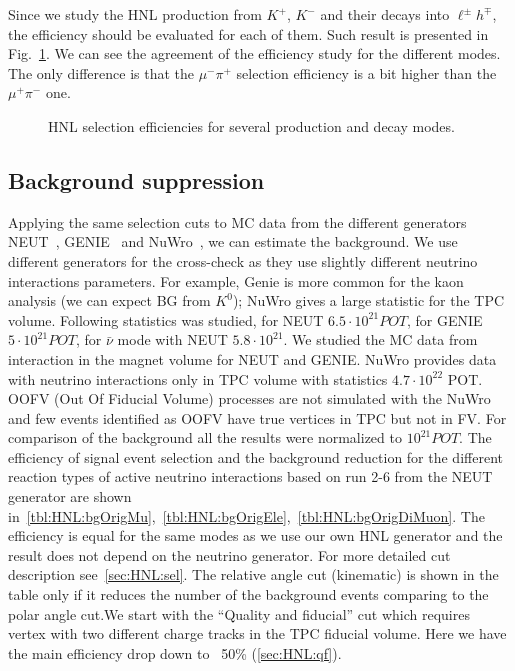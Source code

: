 \documentclass[../main.tex]{subfiles}
\begin{document}
Since we study the HNL production from $K^+$,  $K^-$ and their decays into $\ell^{\pm}h^{\mp}$, the efficiency should be evaluated for each of them. Such result is presented in Fig.~\ref{fig:HNL:C_check}. We can see the agreement of the efficiency study for the different modes. The only difference is that the $\mu^-\pi^+$ selection efficiency is a bit higher than the $\mu^+\pi^-$ one.
\begin{figure}[!ht]
  \begin{minipage}{0.49\linewidth}
  \end{minipage}
  \hfill
  \begin{minipage}{0.49\linewidth}
  \end{minipage}
  \caption{HNL selection efficiencies for several production and decay modes.}
  \label{fig:HNL:C_check}
\end{figure}

\subsection{Background suppression}
\label{sec:HNL:bg}
Applying the same selection cuts to MC data from the different generators NEUT~\cite{Hayato2002}, GENIE~\cite{Andreopoulos2010} and NuWro~\cite{Zmuda2015}, we can estimate the background. We use different generators for the cross-check as they use slightly different neutrino interactions parameters. For example, Genie is more common for the kaon analysis (we can expect BG from $K^0$); NuWro gives a large statistic for the TPC volume. Following statistics was studied, for NEUT $6.5\cdot 10^{21} POT$, for GENIE $5\cdot 10^{21}POT$, for $\bar{\nu}$ mode with NEUT $5.8\cdot 10^{21}$. We studied the MC data from interaction in the magnet volume for NEUT and GENIE. NuWro provides data with neutrino interactions only in TPC volume with statistics $4.7\cdot10^{22}$ POT. OOFV (Out Of Fiducial Volume) processes are not simulated with the NuWro and few events identified as OOFV have true vertices in TPC but not in FV. For comparison of the background all the results were normalized to $10^{21}POT$. The efficiency of signal event selection and the background reduction for the different reaction types of active neutrino interactions based on run 2-6 from the NEUT generator are shown in~\autoref{tbl:HNL:bgOrigMu},~\autoref{tbl:HNL:bgOrigEle},~\autoref{tbl:HNL:bgOrigDiMuon}. The efficiency is equal for the same modes as we use our own HNL generator and the result does not depend on the neutrino generator. For more detailed cut description see~\autoref{sec:HNL:sel}. The relative angle cut (kinematic) is shown in the table only if it reduces the number of the background events comparing to the polar angle cut.We start with the ``Quality and fiducial'' cut which requires  vertex with two different charge tracks in the TPC fiducial volume. Here we have the main efficiency drop down to ~50\% (\autoref{sec:HNL:qf}).
\end{document}
